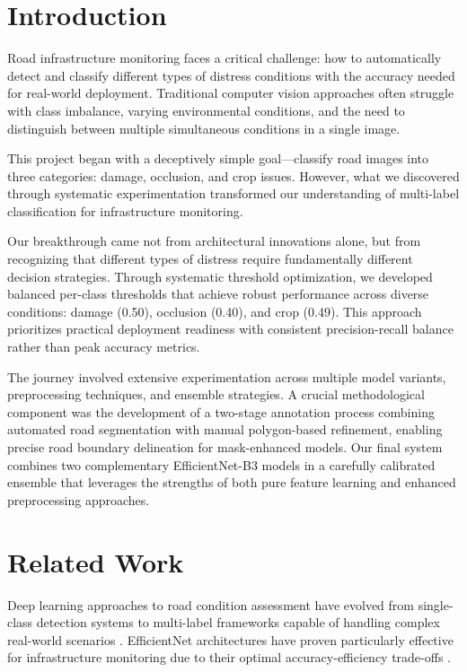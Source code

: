 \documentclass[12pt]{article}
\begin{document}
\section{Introduction}

Road infrastructure monitoring faces a critical challenge: how to automatically detect and classify different types of distress conditions with the accuracy needed for real-world deployment. Traditional computer vision approaches often struggle with class imbalance, varying environmental conditions, and the need to distinguish between multiple simultaneous conditions in a single image.

This project began with a deceptively simple goal—classify road images into three categories: damage, occlusion, and crop issues. However, what we discovered through systematic experimentation transformed our understanding of multi-label classification for infrastructure monitoring.

Our breakthrough came not from architectural innovations alone, but from recognizing that different types of distress require fundamentally different decision strategies. Through systematic threshold optimization, we developed balanced per-class thresholds that achieve robust performance across diverse conditions: damage (0.50), occlusion (0.40), and crop (0.49). This approach prioritizes practical deployment readiness with consistent precision-recall balance rather than peak accuracy metrics.

The journey involved extensive experimentation across multiple model variants, preprocessing techniques, and ensemble strategies. A crucial methodological component was the development of a two-stage annotation process combining automated road segmentation with manual polygon-based refinement, enabling precise road boundary delineation for mask-enhanced models. Our final system combines two complementary EfficientNet-B3 models in a carefully calibrated ensemble that leverages the strengths of both pure feature learning and enhanced preprocessing approaches.

\section{Related Work}

Deep learning approaches to road condition assessment have evolved from single-class detection systems to multi-label frameworks capable of handling complex real-world scenarios \citet{he2016deep}. EfficientNet architectures have proven particularly effective for infrastructure monitoring due to their optimal accuracy-efficiency trade-offs \citet{krizhevsky2012imagenet}.
\end{document}
